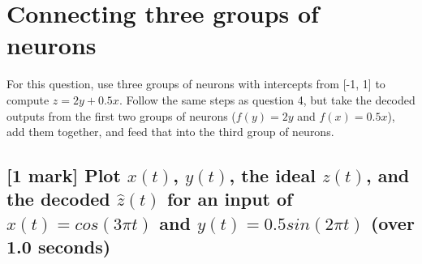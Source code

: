\documentclass{article}
\begin{document}
\section{Connecting three groups of neurons}\label{connecting-three-groups-of-neurons}

For this question, use three groups of neurons with intercepts from
{[}-1, 1{]} to compute $z = 2y+0.5x$. Follow the same steps as question
4, but take the decoded outputs from the first two groups of neurons
($f(y)=2y$ and $f(x)=0.5x$), add them together, and feed that into the
third group of neurons.

\subsection{{[}1 mark{]} Plot $x(t)$, $y(t)$, the ideal $z(t)$, and the
decoded $\hat{z}(t)$ for an input of $x(t)=cos(3\pi t)$ and
$y(t)=0.5 sin (2 \pi t)$ (over 1.0
seconds)}\label{mark-plot-xt-yt-the-ideal-zt-and-the-decoded-hatzt-for-an-input-of-xtcos3pi-t-and-yt0.5-sin-2-pi-t-over-1.0-seconds}
\end{document}
